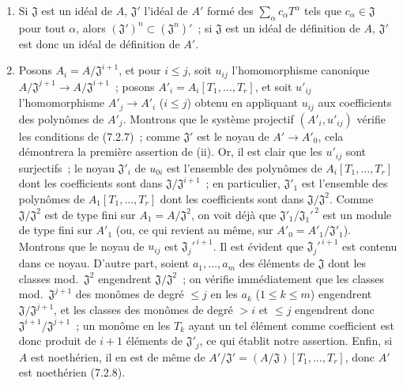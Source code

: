 \begin{enumerate}
  \item[(i)] Si $\mathfrak J$ est un idéal de $A$, $\mathfrak J'$ l'idéal de
  $A'$ formé des $\sum_\alpha c_\alpha T^\alpha$ tels que
  $c_\alpha\in\mathfrak J$ pour tout $\alpha$, alors
  $(\mathfrak J')^n\subset(\mathfrak J^n)'$~; si $\mathfrak J$ est un idéal de
  définition de $A$, $\mathfrak J'$ est donc un idéal de définition de $A'$.

  \item[(ii)] Posons $A_i=A/\mathfrak J^{i+1}$, et pour $i\leq j$, soit
  $u_{ij}$ l'homomorphisme canonique
  $A/\mathfrak J^{j+1}\to A/\mathfrak J^{i+1}$~; posons
  $A'_i=A_i[T_1,\ldots,T_r]$, et soit $u'_{ij}$ l'homomorphisme
  $A'_j\to A'_i$ ($i\leq j$) obtenu en appliquant $u_{ij}$ aux coefficients
  des polynômes de $A'_j$. Montrons que le système projectif
  $(A'_i,u'_{ij})$ vérifie les conditions de (7.2.7)~; comme $\mathfrak J'$ est
  le noyau de $A'\to A'_0$, cela démontrera la première assertion de (ii). Or,
  il est clair que les $u'_{ij}$ sont surjectifs~; le noyau $\mathfrak J'_i$
  de $u_{0i}$ est l'ensemble des polynômes de
  $A_i[T_1,\ldots,T_r]$ dont les coefficients sont dans
  $\mathfrak J/\mathfrak J^{i+1}$~; en particulier, $\mathfrak J'_1$ est
  l'ensemble des polynômes de $A_1[T_1,\ldots,T_r]$ dont les coefficients
  sont dans $\mathfrak J/\mathfrak J^2$. Comme $\mathfrak J/\mathfrak J^2$
  est de type fini sur $A_1=A/\mathfrak J^2$, on voit déjà que
  $\mathfrak J'_1/\mathfrak J_1'^{\,2}$ est un module de type fini sur $A'_1$
  (ou, ce qui revient au même, sur
  $A'_0=A'_1/\mathfrak J'_1$). Montrons que le noyau de $u_{ij}$ est
  $\mathfrak J_j'^{\,i+1}$. Il est évident que
  $\mathfrak J_j'^{\,i+1}$ est contenu dans ce noyau. D'autre part, soient
  $a_1,\ldots,a_m$ des éléments de $\mathfrak J$ dont les classes
  mod.~$\mathfrak J^2$ engendrent $\mathfrak J/\mathfrak J^2$~; on vérifie
  immédiatement que les classes mod.~$\mathfrak J^{j+1}$ des monômes de degré
  $\leq j$ en les $a_k$ ($1\leq k\leq m$) engendrent
  $\mathfrak J/\mathfrak J^{j+1}$, et les classes des monômes de degré $>i$
  et $\leq j$ engendrent donc
  $\mathfrak J^{i+1}/\mathfrak J^{j+1}$~; un monôme en les $T_k$ ayant un tel
  élément comme coefficient est donc produit de $i+1$ éléments de
  $\mathfrak J'_j$, ce qui établit notre assertion. Enfin, si $A$ est
  noethérien, il en est de même de
  $A'/\mathfrak J'=(A/\mathfrak J)[T_1,\ldots,T_r]$, donc $A'$ est noethérien
  (7.2.8).
\end{enumerate}


